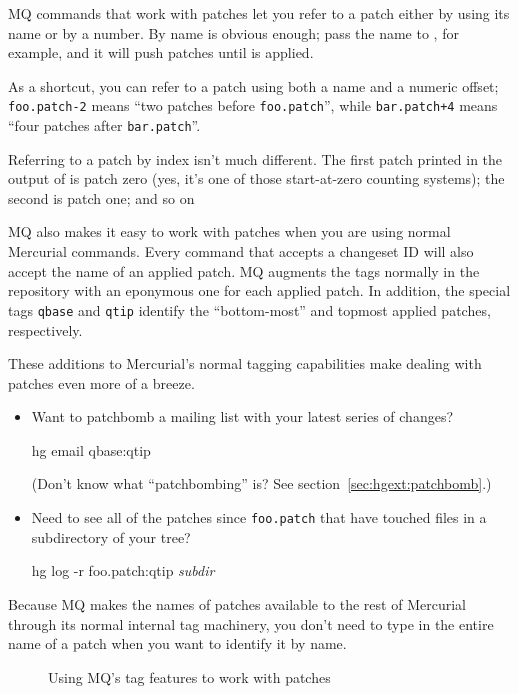 MQ commands that work with patches let you refer to a patch either by
using its name or by a number.  By name is obvious enough; pass the
name  to , for example, and it will
push patches until  is applied.  

As a shortcut, you can refer to a patch using both a name and a
numeric offset; \texttt{foo.patch-2} means ``two patches before
\texttt{foo.patch}'', while \texttt{bar.patch+4} means ``four patches
after \texttt{bar.patch}''.

Referring to a patch by index isn't much different.  The first patch
printed in the output of  is patch zero (yes, it's one
of those start-at-zero counting systems); the second is patch one; and
so on

MQ also makes it easy to work with patches when you are using normal
Mercurial commands.  Every command that accepts a changeset ID will
also accept the name of an applied patch.  MQ augments the tags
normally in the repository with an eponymous one for each applied
patch.  In addition, the special tags \texttt{qbase} and \texttt{qtip} identify the ``bottom-most'' and
topmost applied patches, respectively.

These additions to Mercurial's normal tagging capabilities make
dealing with patches even more of a breeze.
\begin{itemize}
\item Want to patchbomb a mailing list with your latest series of
  changes?
  \begin{codesample4}
    hg email qbase:qtip
  \end{codesample4}
  (Don't know what ``patchbombing'' is?  See
  section~\ref{sec:hgext:patchbomb}.)
\item Need to see all of the patches since \texttt{foo.patch} that
  have touched files in a subdirectory of your tree?
  \begin{codesample4}
    hg log -r foo.patch:qtip \emph{subdir}
  \end{codesample4}
\end{itemize}

Because MQ makes the names of patches available to the rest of
Mercurial through its normal internal tag machinery, you don't need to
type in the entire name of a patch when you want to identify it by
name.

\begin{figure}[ht]
  \caption{Using MQ's tag features to work with patches}
  \label{ex:mq:id}
\end{figure}

